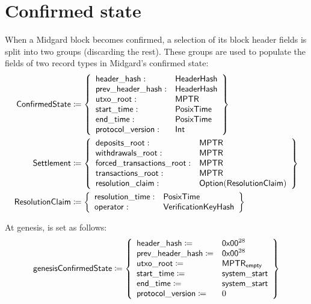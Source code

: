 \documentclass[../midgard.tex]{subfiles}
\begin{document}
\section{Confirmed state}
\label{h:confirmed-state}

When a Midgard block becomes confirmed, a selection of its block header fields is split into two groups (discarding the rest).
These groups are used to populate the fields of two record types in Midgard's confirmed state:
\begingroup
\allowdisplaybreaks
\begin{align*}
    \mathsf{ConfirmedState} &\coloneq \left\{
    \begin{array}{ll}
        \mathsf{header\_hash} : & \mathsf{HeaderHash} \\
        \mathsf{prev\_header\_hash} : & \mathsf{HeaderHash} \\
        \mathsf{utxo\_root} : & \mathsf{MPTR} \\
        \mathsf{start\_time} : & \mathsf{PosixTime} \\
        \mathsf{end\_time} : & \mathsf{PosixTime} \\
        \mathsf{protocol\_version} : & \mathsf{Int} \\
    \end{array} \right\} \\
    \mathsf{Settlement} &\coloneq \left\{
    \begin{array}{ll}
        \mathsf{deposits\_root} : & \mathsf{MPTR} \\
        \mathsf{withdrawals\_root} : & \mathsf{MPTR} \\
        \mathsf{forced\_transactions\_root} : & \mathsf{MPTR} \\
        \mathsf{transactions\_root} : & \mathsf{MPTR} \\
        \mathsf{resolution\_claim}: & \mathsf{Option}(\mathsf{ResolutionClaim})
    \end{array} \right\} \\
    \mathsf{ResolutionClaim} &\coloneq \left\{
    \begin{array}{ll}
        \mathsf{resolution\_time}: & \mathsf{PosixTime} \\
        \mathsf{operator}: & \mathsf{VerificationKeyHash}
    \end{array}
    \right\}
\end{align*}
\endgroup

At genesis,  is set as follows:
\begin{equation*}
    \mathsf{genesisConfirmedState} \coloneq \left\{
        \begin{array}{ll}
            \mathsf{header\_hash} \coloneq & \mathsf{0x00}^{28} \\
            \mathsf{prev\_header\_hash} \coloneq & \mathsf{0x00}^{28} \\
            \mathsf{utxo\_root} \coloneq & \mathsf{MPTR}_{\mathsf{empty}} \\
            \mathsf{start\_time} \coloneq & \mathsf{system\_start} \\
            \mathsf{end\_time} \coloneq & \mathsf{system\_start} \\
            \mathsf{protocol\_version} \coloneq & 0
        \end{array} \right\}
\end{equation*}
\end{document}
